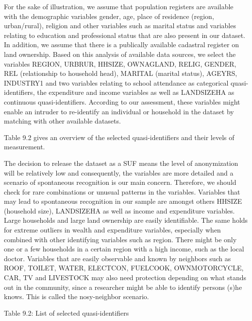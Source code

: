 \documentclass[letterpaper,10pt,english]{sphinxmanual}
\begin{document}
For the sake of illustration, we assume that population registers are
available with the demographic variables gender, age, place of residence
(region, urban/rural), religion and other variables such as marital
status and variables relating to education and professional status that
are also present in our dataset. In addition, we assume that there is a
publically available cadastral register on land ownership. Based on this
analysis of available data sources, we select the variables REGION,
URBRUR, HHSIZE, OWNAGLAND, RELIG, GENDER, REL (relationship to household
head), MARITAL (marital status), AGEYRS, INDUSTRY1 and two variables
relating to school attendance as categorical quasi-identifiers, the
expenditure and income variables as well as LANDSIZEHA as continuous
quasi-identifiers. According to our assessment, these variables might
enable an intruder to re-identify an individual or household in the
dataset by matching with other available datasets.

Table 9.2 gives an overview of the selected quasi-identifiers and their
levels of measurement.

The decision to release the dataset as a SUF means the level of
anonymization will be relatively low and consequently, the variables are
more detailed and a scenario of spontaneous recognition is our main
concern. Therefore, we should check for rare combinations or unusual
patterns in the variables. Variables that may lead to spontaneous
recognition in our sample are amongst others HHSIZE (household size),
LANDSIZEHA as well as income and expenditure variables. Large households
and large land ownership are easily identifiable. The same holds for
extreme outliers in wealth and expenditure variables, especially when
combined with other identifying variables such as region. There might be
only one or a few households in a certain region with a high income,
such as the local doctor. Variables that are easily observable and known
by neighbors such as ROOF, TOILET, WATER, ELECTCON, FUELCOOK,
OWNMOTORCYCLE, CAR, TV and LIVESTOCK may also need protection depending
on what stands out in the community, since a researcher might be able to
identify persons (s)he knows. This is called the nosy-neighbor scenario.

Table 9.2: List of selected quasi-identifiers
\end{document}
